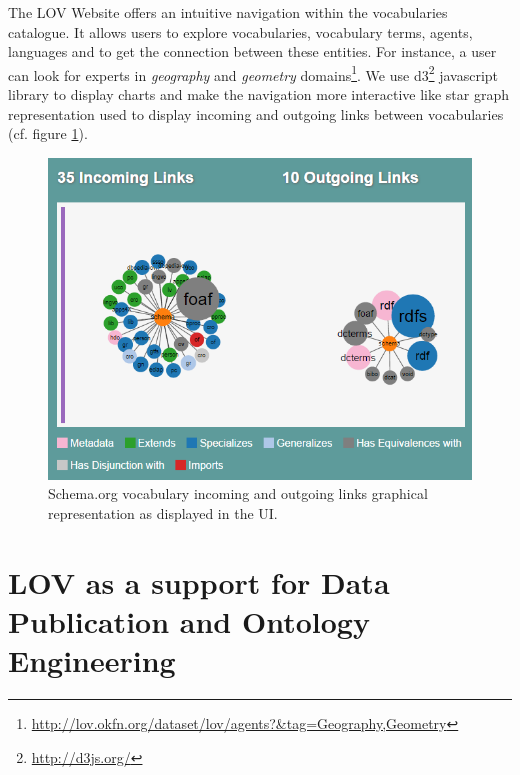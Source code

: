 \documentclass{iosart2c}
\begin{document}
The LOV Website offers an intuitive navigation within the vocabularies catalogue. It allows users to explore vocabularies, vocabulary terms, agents, languages and to get the connection between these entities. For instance, a user can look for experts in \emph{geography} and \emph{geometry} domains\footnote{\url{http://lov.okfn.org/dataset/lov/agents?&tag=Geography,Geometry}}. We use d3\footnote{\url{http://d3js.org/}} javascript library to display charts and make the navigation more interactive like star graph representation used to display incoming and outgoing links between vocabularies (cf. figure \ref{fig:graphVocab}). 


\begin{figure}[ht!b]
\includegraphics[scale=0.45]{graphVocab.png}
\caption{Schema.org vocabulary incoming and outgoing links graphical representation as displayed in the UI.}
\label{fig:graphVocab}
\end{figure}




\section{LOV as a support for Data Publication and Ontology Engineering}
\label{sec:dataPubOntoEngine}
\end{document}
